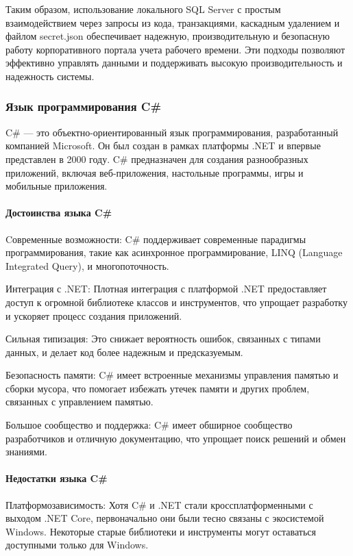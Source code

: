 Таким образом, использование локального SQL Server с простым взаимодействием через запросы из кода, транзакциями, каскадным удалением и файлом secret.json обеспечивает надежную, производительную и безопасную работу корпоративного портала учета рабочего времени. Эти подходы позволяют эффективно управлять данными и поддерживать высокую производительность и надежность системы.

\subsubsection{Язык программирования C\#}

C\# — это объектно-ориентированный язык программирования, разработанный компанией Microsoft. Он был создан в рамках платформы .NET и впервые представлен в 2000 году. C\# предназначен для создания разнообразных приложений, включая веб-приложения, настольные программы, игры и мобильные приложения.

\paragraph{Достоинства языка C\#}

Cовременные возможности: C\# поддерживает современные парадигмы программирования, такие как асинхронное программирование, LINQ (Language Integrated Query), и многопоточность.

Интеграция с .NET: Плотная интеграция с платформой .NET предоставляет доступ к огромной библиотеке классов и инструментов, что упрощает разработку и ускоряет процесс создания приложений.

Сильная типизация: Это снижает вероятность ошибок, связанных с типами данных, и делает код более надежным и предсказуемым.

Безопасность памяти: C\# имеет встроенные механизмы управления памятью и сборки мусора, что помогает избежать утечек памяти и других проблем, связанных с управлением памятью.

Большое сообщество и поддержка: C\# имеет обширное сообщество разработчиков и отличную документацию, что упрощает поиск решений и обмен знаниями.

\paragraph{Недостатки языка C\#}

Платформозависимость: Хотя C\# и .NET стали кроссплатформенными с выходом .NET Core, первоначально они были тесно связаны с экосистемой Windows. Некоторые старые библиотеки и инструменты могут оставаться доступными только для Windows.

